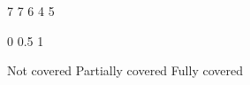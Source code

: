 \usepackage{xfp}
\makeatletter

\usepackage{xcolor}
\iftemplate
  \newcommand{\note}[1]{\textcolor{blue}{\textit{#1}}}
\else
  \newcommand{\note}[1]{}
\fi


\def\MoM@mtcount{5}

\expandafter\def\csname MT@numq@1\endcsname{7}
\expandafter\def\csname MT@numq@2\endcsname{7}
\expandafter\def\csname MT@numq@3\endcsname{6}
\expandafter\def\csname MT@numq@4\endcsname{4}
\expandafter\def\csname MT@numq@5\endcsname{5}


\expandafter\def\csname MT@val@NC\endcsname{0}
\expandafter\def\csname MT@val@PC\endcsname{0.5}
\expandafter\def\csname MT@val@FC\endcsname{1}

\expandafter\def\csname MT@text@NC\endcsname{Not covered}
\expandafter\def\csname MT@text@PC\endcsname{Partially covered}
\expandafter\def\csname MT@text@FC\endcsname{Fully covered}

\newcommand{\MT@MapVal}[1]{%
  \ifcsname MT@val@#1\endcsname
    \csname MT@val@#1\endcsname
  \else
    0%
  \fi
}

\newcommand{\MT@MapText}[1]{%
  \ifcsname MT@text@#1\endcsname
    \csname MT@text@#1\endcsname
  \else
    \textit{(unset)}%
  \fi
}


\newcommand{\MTNumQ}[1]{\csname MT@numq@#1\endcsname}

\newcommand{\MT}[3]{%
  \if\relax\detokenize{#3}\relax
    \ifcsname MT@#1@#2\endcsname
      \csname MT@#1@#2\endcsname
    \else
      NC%
    \fi
  \else
    \expandafter\gdef\csname MT@#1@#2\endcsname{#3}%
  \fi
}

